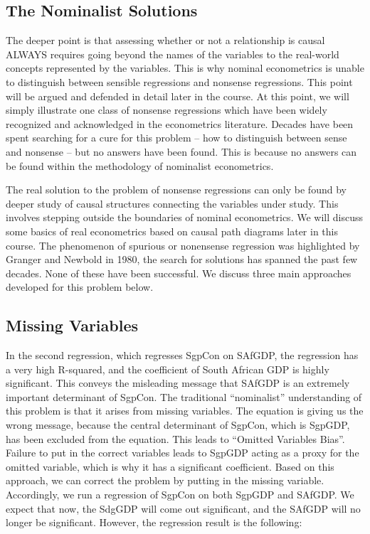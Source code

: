 \documentclass[
  letterpaper,
  DIV=11,
  numbers=noendperiod]{scrartcl}
\begin{document}
\hypertarget{the-nominalist-solutions}{%
\subsection{The Nominalist Solutions}\label{the-nominalist-solutions}}

The deeper point is that assessing whether or not a relationship is
causal ALWAYS requires going beyond the names of the variables to the
real-world concepts represented by the variables. This is why nominal
econometrics is unable to distinguish between sensible regressions and
nonsense regressions. This point will be argued and defended in detail
later in the course. At this point, we will simply illustrate one class
of nonsense regressions which have been widely recognized and
acknowledged in the econometrics literature. Decades have been spent
searching for a cure for this problem -- how to distinguish between
sense and nonsense -- but no answers have been found. This is because no
answers can be found within the methodology of nominalist econometrics.

The real solution to the problem of nonsense regressions can only be
found by deeper study of causal structures connecting the variables
under study. This involves stepping outside the boundaries of nominal
econometrics. We will discuss some basics of real econometrics based on
causal path diagrams later in this course. The phenomenon of spurious or
nonensense regression was highlighted by Granger and Newbold in 1980,
the search for solutions has spanned the past few decades. None of these
have been successful. We discuss three main approaches developed for
this problem below.

\hypertarget{missing-variables}{%
\subsection{Missing Variables}\label{missing-variables}}

In the second regression, which regresses SgpCon on SAfGDP, the
regression has a very high R-squared, and the coefficient of South
African GDP is highly significant. This conveys the misleading message
that SAfGDP is an extremely important determinant of SgpCon. The
traditional ``nominalist'' understanding of this problem is that it
arises from missing variables. The equation is giving us the wrong
message, because the central determinant of SgpCon, which is SgpGDP, has
been excluded from the equation. This leads to ``Omitted Variables
Bias''. Failure to put in the correct variables leads to SgpGDP acting
as a proxy for the omitted variable, which is why it has a significant
coefficient. Based on this approach, we can correct the problem by
putting in the missing variable. Accordingly, we run a regression of
SgpCon on both SgpGDP and SAfGDP. We expect that now, the SdgGDP will
come out significant, and the SAfGDP will no longer be significant.
However, the regression result is the following:
\end{document}
